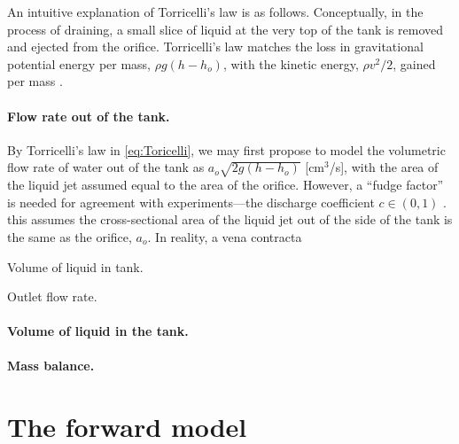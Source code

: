 \documentclass[openacc]{rsproca_new}%
\begin{document}
An intuitive explanation of Torricelli's law is as follows. 
Conceptually, in the process of draining, a small slice of liquid at the very top of the tank is removed and ejected from the orifice. 
Torricelli's law matches the loss in gravitational potential energy per mass, $\rho g(h-h_o)$, with the kinetic energy, $\rho v^2/2$, gained per mass \cite{groetsch1993inverse}. 


\paragraph{Flow rate out of the tank.}
By Torricelli's law in \ref{eq:Toricelli}, we may first propose to model the volumetric flow rate of water out of the tank as $a_o\sqrt{2 g(h-h_o)}$ [cm$^3$/s], with the area of the liquid jet assumed equal to the area of the orifice. 
However, a ``fudge factor'' is needed for agreement with experiments---the discharge coefficient $c\in(0,1)$ \cite{lienhard1984velocity}.
 this assumes the cross-sectional area of the liquid jet out of the side of the tank is the same as the orifice, $a_o$. In reality, a vena contracta 


Volume of liquid in tank. 

Outlet flow rate.


\paragraph{Volume of liquid in the tank.}


\paragraph{Mass balance.}
\section{The forward model}
\end{document}
